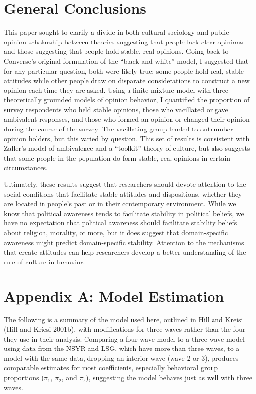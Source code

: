 \documentclass[12pt,]{article}
\begin{document}
\hypertarget{general-conclusions}{%
\section{General Conclusions}\label{general-conclusions}}

This paper sought to clarify a divide in both cultural sociology and public opinion scholarship between theories suggesting that people lack clear opinions and those suggesting that people hold stable, real opinions. Going back to Converse's original formulation of the ``black and white'' model, I suggested that for any particular question, both were likely true: some people hold real, stable attitudes while other people draw on disparate considerations to construct a new opinion each time they are asked. Using a finite mixture model with three theoretically grounded models of opinion behavior, I quantified the proportion of survey respondents who held stable opinions, those who vacillated or gave ambivalent responses, and those who formed an opinion or changed their opinion during the course of the survey. The vacillating group tended to outnumber opinion holders, but this varied by question. This set of results is consistent with Zaller's model of ambivalence and a ``toolkit'' theory of culture, but also suggests that some people in the population do form stable, real opinions in certain circumstances.

Ultimately, these results suggest that researchers should devote attention to the social conditions that facilitate stable attitudes and dispositions, whether they are located in people's past or in their contemporary environment. While we know that political awareness tends to facilitate stability in political beliefs, we have no expectation that political awareness should facilitate stability beliefs about religion, morality, or more, but it does suggest that domain-specific awareness might predict domain-specific stability. Attention to the mechanisms that create attitudes can help researchers develop a better understanding of the role of culture in behavior.

\hypertarget{appendix-a-model-estimation}{%
\section{Appendix A: Model Estimation}\label{appendix-a-model-estimation}}

The following is a summary of the model used here, outlined in Hill and Kreisi (Hill and Kriesi 2001b), with modifications for three waves rather than the four they use in their analysis. Comparing a four-wave model to a three-wave model using data from the NSYR and LSG, which have more than three waves, to a model with the same data, dropping an interior wave (wave 2 or 3), produces comparable estimates for most coefficients, especially behavioral group proportions (\(\pi_1\), \(\pi_2\), and \(\pi_3\)), suggesting the model behaves just as well with three waves.
\end{document}
